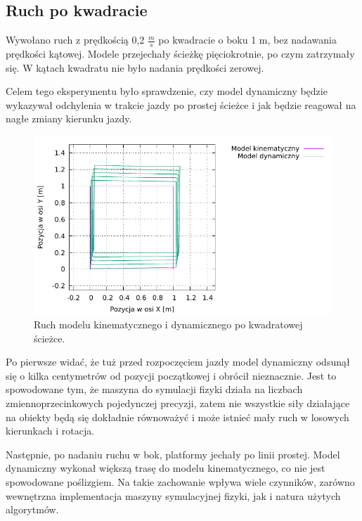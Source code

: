	\subsection{Ruch po kwadracie}
		\label{sec:test_square}
		Wywołano ruch z prędkością 0,2 $\frac{m}{s}$ po kwadracie o boku 1 m, bez nadawania prędkości kątowej.
		Modele przejechały ścieżkę pięciokrotnie, po czym zatrzymały się. W kątach kwadratu nie było nadania prędkości zerowej.
		
		Celem tego eksperymentu było sprawdzenie, czy model dynamiczny będzie wykazywał odchylenia w trakcie jazdy po prostej ścieżce 
		i jak będzie reagował na nagłe zmiany kierunku jazdy.
		
		\begin{figure}[H]
			\centering
			\includegraphics[width=\textwidth]{plots/square.pdf}
				\caption{Ruch modelu kinematycznego i dynamicznego po kwadratowej ścieżce.}
			\label{plot:gramofon_square}
		\end{figure}
		
		Po pierwsze widać, że tuż przed rozpoczęciem jazdy model dynamiczny odsunął się o kilka centymetrów od pozycji początkowej i obrócił nieznacznie.
		Jest to spowodowane tym, że maszyna do symulacji fizyki działa na liczbach zmiennoprzecinkowych pojedynczej precyzji,
		zatem nie wszystkie siły działające na obiekty będą się dokładnie równoważyć i może istnieć mały ruch w losowych kierunkach i rotacja.
		
		Następnie, po nadaniu ruchu w bok, platformy jechały po linii prostej.
		Model dynamiczny wykonał większą trasę do modelu kinematycznego, co nie jest spowodowane poślizgiem.
		Na takie zachowanie wpływa wiele czynników, zarówno wewnętrzna implementacja maszyny symulacyjnej fizyki, jak i natura użytych algorytmów.
		
